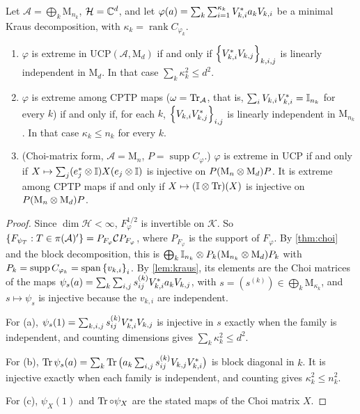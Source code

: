 \documentclass[12pt]{article}
\newcommand{\alg}{\mathcal{A}}             %
\newcommand{\hilb}{\mathcal{H}}            %
\newcommand{\dil}{\mathcal{K}}             %
\newcommand{\Mn}[1]{\mathrm{M}_{#1}}       %
\newcommand{\Fphi}{F_{\varphi}}
\newcommand{\Choi}{C_{\varphi}}
\newcommand{\comm}{\mathcal{C}}            %
\begin{document}
\begin{corollary}
\label{cor:extreme-kraus}
Let \(\alg = \bigoplus_k \Mn{n_k}\), \(\hilb = \complex^d\), and let
\(\varphi(a) = \sum_k\sum_{i=1}^{\kappa_k} V_{k,i}^* a_k V_{k,i}\) be a minimal
Kraus decomposition, with \(\kappa_k = \operatorname{rank}C_{\varphi_k}\).
\begin{enumerate}[label=(\alph*)]
  \item \label{it:ck-ucp}
    \(\varphi\) is extreme in \(\mathrm{UCP}(\alg, \Mn d)\) if and only if
    \(\left\{ V_{k,i}^* V_{k,j} \right\}_{k,i,j}\) is linearly independent in \(\Mn d\).
    In that case \(\sum_k \kappa_k^2 \le d^2\).
  \item \label{it:ck-tp}
    \(\varphi\) is extreme among CPTP maps (\(\omega = \trace_\alg\), that is,
    \(\sum_i V_{k,i}V_{k,i}^* = {\mathbb I}_{n_k}\) for every \(k\)) if and only if, for
    each \(k\), \(\left\{ V_{k,i}V_{k,j}^* \right\}_{i,j}\) is linearly independent in
    \(\Mn{n_k}\). In that case \(\kappa_k \le n_k\) for every \(k\).
  \item \label{it:ck-choi}
    (Choi-matrix form, \(\alg = \Mn n\), \(P = \operatorname{supp}\Choi\).) \(\varphi\)
    is extreme in UCP if and only if \(X \mapsto \sum_j (e_j^* \otimes {\mathbb I})
    X (e_j \otimes {\mathbb I})\) is injective on \(P(\Mn n \tensor \Mn d)P\). It is extreme
    among CPTP maps if and only if \(X \mapsto ({\mathbb I} \otimes \operatorname{Tr})(X)\) is injective
    on \(P(\Mn n \tensor \Mn d)P\).
\end{enumerate}
\end{corollary}
\begin{proof}
Since \(\dim\hilb < \infty\), \(\Fphi^{1/2}\) is invertible on \(\dil\). So
\(\set{F_{\psi_T} : T \in \pi(\alg)'} = P_{\Fphi}\comm P_{\Fphi}\), where
\(P_{\Fphi}\) is the support of \(\Fphi\). By \cref{thm:choi} and the block
decomposition, this is
\(\bigoplus_k \id_{n_k} \tensor P_k(\Mn{n_k} \tensor \Mn d)P_k\) with
\(P_k = \operatorname{supp}C_{\varphi_k} = \operatorname{span}\left\{ v_{k,i} \right\}_i\). By
\cref{lem:kraus}, its elements are the Choi matrices of the maps
\(\psi_s(a) = \sum_k\sum_{i,j} s^{(k)}_{ij}V_{k,i}^* a_kV_{k,j}\), with
\(s = (s^{(k)}) \in \bigoplus_k \Mn{\kappa_k}\), and \(s \mapsto \psi_s\) is
injective because the \(v_{k,i}\) are independent.

For (a), \(\psi_s(1) = \sum_{k,i,j}s^{(k)}_{ij}V_{k,i}^* V_{k,j}\) is injective in
\(s\) exactly when the family is independent, and counting dimensions gives
\(\sum_k\kappa_k^2 \le d^2\).

For (b), \(\operatorname{Tr}\psi_s(a) = \sum_k\operatorname{Tr}\big(a_k\sum_{i,j}s^{(k)}_{ij}V_{k,j}V_{k,i}^*\big)\)
is block diagonal in \(k\). It is injective exactly when each family is independent,
and counting gives \(\kappa_k^2 \le n_k^2\).

For (c), \(\psi_X(1)\) and \(\operatorname{Tr}\circ\psi_X\) are the stated maps of the Choi
matrix \(X\).
\end{proof}
\end{document}
